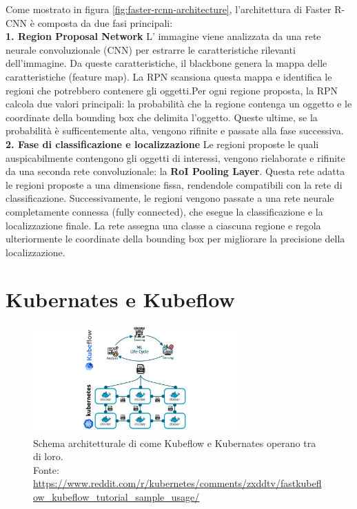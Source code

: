 Come mostrato in figura \ref{fig:faster-rcnn-architecture}, l'architettura di Faster R-CNN
è composta da due fasi principali:\\


\textbf{1. Region Proposal Network}
L' immagine viene analizzata da una rete neurale convoluzionale (CNN) per estrarre
le caratteristiche rilevanti dell'immagine. Da queste caratteristiche, il blackbone
genera la mappa delle caratteristiche (feature map). La RPN scansiona questa mappa
e identifica le regioni che potrebbero contenere gli oggetti.Per ogni regione proposta,
la RPN calcola due valori principali: la probabilità che la regione contenga un oggetto
e le coordinate della bounding box che delimita l'oggetto. Queste ultime, se la probabilità
è sufficentemente alta, vengono rifinite e passate alla fase successiva.\\


\textbf{2. Fase di classificazione e localizzazione}
Le regioni proposte le quali auspicabilmente contengono gli oggetti di interessi,
vengono rielaborate e rifinite da una seconda rete convoluzionale: la \textbf{RoI Pooling Layer}.
Questa rete adatta le regioni proposte a una dimensione fissa, rendendole compatibili
con la rete di classificazione. Successivamente, le regioni vengono passate a una rete
neurale completamente connessa (fully connected), che esegue la classificazione e la
localizzazione finale. La rete assegna una classe a ciascuna regione e regola ulteriormente
le coordinate della bounding box per migliorare la precisione della localizzazione.








\section{Kubernates e Kubeflow}
\begin{figure}[H]
   \centering
   \includegraphics[width=0.7\textwidth]{images/kubernates-kubeflow-schema.png}
       \caption{Schema architetturale di come Kubeflow e Kubernates operano tra di loro.\\
       Fonte: \url{https://www.reddit.com/r/kubernetes/comments/zxddtv/fastkubeflow_kubeflow_tutorial_sample_usage/}}
   \label{fig:kubeflow-architecture}
\end{figure}


